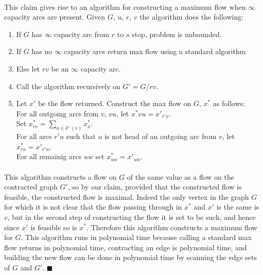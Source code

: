 \documentclass[letterpaper,12pt,oneside,onecolumn]{article}
\begin{document}
\paragraph{}
This claim gives rise to an algorithm for constructing a maximum flow when $\infty$ capacity arcs are present. Given $G$, $u$, $r$, $v$ the algorithm does the following:
\begin{enumerate}
\item If $G$ has $\infty$ capacity arc from $r$ to $s$ stop, problem is unbounded.\\
\item If $G$ has no $\infty$ capacity arcs return max flow using a standard algorithm\\
\item Else let $rv$ be an $\infty$ capacity arc.\\
\item Call the algorithm recursively on $G' = G/rv$.\\
\item Let $x'$ be the flow returned. Construct the max flow on $G$, $x^*$ as follows:\\
\subitem For all outgoing arcs from $v$, $vu$, let $x^*{vu} = x'_{r'u}$.\\
\subitem Set $x^*_{rv} = \sum_{a \in \delta^+(v)} x^*_{a}$.\\
\subitem For all arcs $r'u$ such that $u$ is not head of an outgoing arc from $v$, let $x^*_{ru} = x'_{r'u}$,\\
\subitem For all remainig arcs $uw$ set $x^*_{uw} = x'_{uw}$.
\end{enumerate}
\paragraph{}
This algorithm constructs a flow on $G$ of the same value as a flow on the contracted graph $G'$, so by our claim, provided that the constructed flow is feasible, the constructed flow is maximal. Indeed the only vertex in the graph $G$ for which it is not clear that the flow passing through in $x^*$ and $x'$ is the same is $v$, but in the second step of constructing the flow it is set to be such, and hence since $x'$ is feasible so is $x^*$. Therefore this algorithm constructs a maximum flow for $G$. This algorithm runs in polynomial time because calling a standard max flow returns in polynomial time, contracting an edge is polynomial time, and building the new flow can be done in polynomial time by scanning the edge sets of $G$ and $G'$. $\blacksquare$
\end{document}
